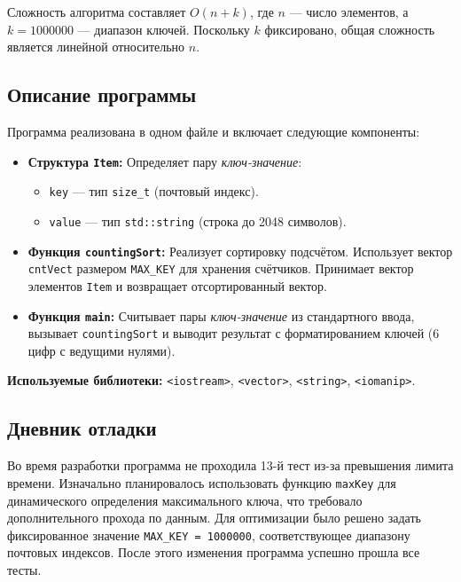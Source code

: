 \documentclass[12pt]{article}
\begin{document}
Сложность алгоритма составляет $O(n + k)$, где $n$ --- число элементов, а $k = 1000000$ --- диапазон ключей. Поскольку $k$ фиксировано, общая сложность является линейной относительно $n$.

\subsection*{Описание программы}

Программа реализована в одном файле и включает следующие компоненты:

\begin{itemize}
    \item \textbf{Структура \texttt{Item}:}  
    Определяет пару \textit{ключ-значение}:
    \begin{itemize}
        \item \texttt{key} --- тип \texttt{size\_t} (почтовый индекс).
        \item \texttt{value} --- тип \texttt{std::string} (строка до 2048 символов).
    \end{itemize}

    \item \textbf{Функция \texttt{countingSort}:}  
    Реализует сортировку подсчётом. Использует вектор \texttt{cntVect} размером \texttt{MAX\_KEY} для хранения счётчиков. Принимает вектор элементов \texttt{Item} и возвращает отсортированный вектор.

    \item \textbf{Функция \texttt{main}:}  
    Считывает пары \textit{ключ-значение} из стандартного ввода, вызывает \texttt{countingSort} и выводит результат с форматированием ключей (6 цифр с ведущими нулями).
\end{itemize}

\textbf{Используемые библиотеки:} \texttt{<iostream>}, \texttt{<vector>}, \texttt{<string>}, \texttt{<iomanip>}.

\subsection*{Дневник отладки}

Во время разработки программа не проходила 13-й тест из-за превышения лимита времени. Изначально планировалось использовать функцию \texttt{maxKey} для динамического определения максимального ключа, что требовало дополнительного прохода по данным. Для оптимизации было решено задать фиксированное значение \texttt{MAX\_KEY = 1000000}, соответствующее диапазону почтовых индексов. После этого изменения программа успешно прошла все тесты.
\end{document}
